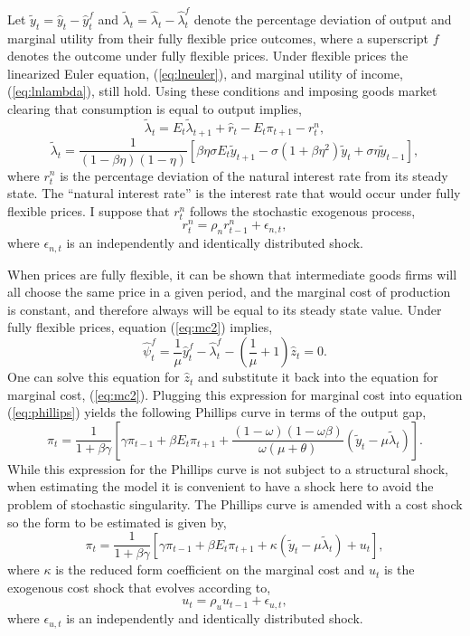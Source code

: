 \documentclass[12pt]{article}
\newcommand{\beq}{\begin{equation}}
\newcommand{\eeq}{\end{equation}}
\newcommand{\bdm}{\begin{displaymath}}
\newcommand{\edm}{\end{displaymath}}
\newcommand{\h}[1]{\hat{#1}}
\begin{document}
Let $\tilde{y}_t = \h{y}_t - \h{y}_t^f$ and $\tilde{\lambda}_t = \h{\lambda}_t - \h{\lambda}_t^f$ denote the percentage deviation of output and marginal utility from their fully flexible price outcomes, where a superscript $f$ denotes the outcome under fully flexible prices.  Under flexible prices the linearized Euler equation, (\ref{eq:lneuler}), and marginal utility of income, (\ref{eq:lnlambda}), still hold.  Using these conditions and imposing goods market clearing that consumption is equal to output implies,
\beq \label{eq:gapeuler} \tilde{\lambda}_{t} = E_t \tilde{\lambda}_{t+1} + \h{r}_t - E_t \pi_{t+1} - r_t^n, \eeq
\beq \label{eq:gaplambda} \tilde{\lambda}_t = \frac{1}{ (1-\beta \eta)(1-\eta)}\left[ \beta \eta \sigma E_t \tilde{y}_{t+1} - \sigma(1+\beta \eta^2) \tilde{y}_t + \sigma \eta \tilde{y}_{t-1} \right], \eeq
where $r_t^n$ is the percentage deviation of the natural interest rate from its steady state.  The ``natural interest rate'' is the interest rate that would occur under fully flexible prices.  I suppose that $r_t^n$ follows the stochastic exogenous process,
\beq \label{eq:natint} r_t^n = \rho_n r_{t-1}^n + \epsilon_{n,t}, \eeq
where $\epsilon_{n,t}$ is an independently and identically distributed shock.

When prices are fully flexible, it can be shown that intermediate goods firms will all choose the same price in a given period, and the marginal cost of production is constant, and therefore always will be equal to its steady state value.  Under fully flexible prices, equation (\ref{eq:mc2}) implies,
\bdm \h{\psi}_t^f = \frac{1}{\mu} \h{y}_t^f - \h{\lambda}_t^f - \left(\frac{1}{\mu} + 1\right) \h{z}_t = 0. \edm
One can solve this equation for $\h{z}_t$ and substitute it back into the equation for marginal cost, (\ref{eq:mc2}).  Plugging this expression for marginal cost into equation (\ref{eq:phillips}) yields the following Phillips curve in terms of the output gap,
\bdm \label{eq:phillips1} \pi_t = \frac{1}{1+\beta \gamma} \left[ \gamma \pi_{t-1} + \beta E_t \pi_{t+1} + \frac{(1-\omega)(1-\omega \beta)}{\omega (\mu + \theta)} (\tilde{y}_t - \mu \tilde{\lambda}_t) \right]. \edm
While this expression for the Phillips curve is not subject to a structural shock, when estimating the model it is convenient to have a shock here to avoid the problem of stochastic singularity.  The Phillips curve is amended with a cost shock so the form to be estimated is given by,
\beq \label{eq:gapphillips} \pi_t = \frac{1}{1+\beta \gamma} \left[ \gamma \pi_{t-1} + \beta E_t \pi_{t+1} + \kappa (\tilde{y}_t - \mu \tilde{\lambda}_t) + u_t\right], \eeq
where $\kappa$ is the reduced form coefficient on the marginal cost and $u_t$ is the exogenous cost shock that evolves according to,
\beq \label{eq:costpush} u_t = \rho_u u_{t-1} + \epsilon_{u,t}, \eeq
where $\epsilon_{u,t}$ is an independently and identically distributed shock.
\end{document}
